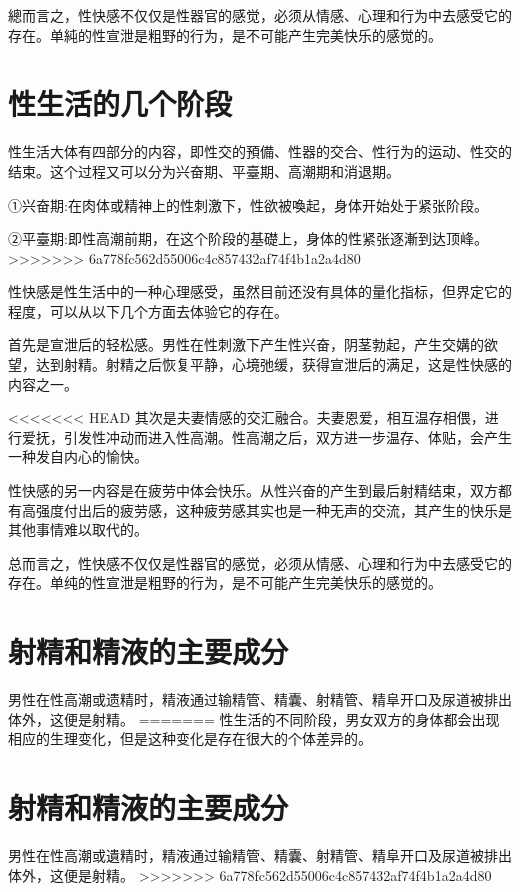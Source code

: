 \documentclass[12pt,UTF8]{ctexbook}
\begin{document}
總而言之，性快感不仅仅是性器官的感觉，必须从情感、心理和行为中去感受它的存在。单純的性宣泄是粗野的行为，是不可能产生完美快乐的感觉的。

\section{性生活的几个阶段}

性生活大体有四部分的内容，即性交的預備、性器的交合、性行为的运动、性交的结束。这个过程又可以分为兴奋期、平臺期、高潮期和消退期。

①兴奋期:在肉体或精神上的性刺激下，性欲被喚起，身体开始处于紧张阶段。

②平臺期:即性高潮前期，在这个阶段的基礎上，身体的性紧张逐漸到达顶峰。
>>>>>>> 6a778fc562d55006c4c857432af74f4b1a2a4d80

性快感是性生活中的一种心理感受，虽然目前还没有具体的量化指标，但界定它的程度，可以从以下几个方面去体验它的存在。

首先是宣泄后的轻松感。男性在性刺激下产生性兴奋，阴茎勃起，产生交媾的欲望，达到射精。射精之后恢复平静，心境弛缓，获得宣泄后的满足，这是性快感的内容之一。

<<<<<<< HEAD
其次是夫妻情感的交汇融合。夫妻恩爱，相互温存相偎，进行爱抚，引发性冲动而进入性高潮。性高潮之后，双方进一步温存、体贴，会产生一种发自内心的愉快。

性快感的另一内容是在疲劳中体会快乐。从性兴奋的产生到最后射精结束，双方都有高强度付出后的疲劳感，这种疲劳感其实也是一种无声的交流，其产生的快乐是其他事情难以取代的。

总而言之，性快感不仅仅是性器官的感觉，必须从情感、心理和行为中去感受它的存在。单纯的性宣泄是粗野的行为，是不可能产生完美快乐的感觉的。

\section{射精和精液的主要成分}

男性在性高潮或遗精时，精液通过输精管、精囊、射精管、精阜开口及尿道被排出体外，这便是射精。
=======
性生活的不同阶段，男女双方的身体都会出现相应的生理变化，但是这种变化是存在很大的个体差异的。

\section{射精和精液的主要成分}

男性在性高潮或遺精时，精液通过输精管、精囊、射精管、精阜开口及尿道被排出体外，这便是射精。
>>>>>>> 6a778fc562d55006c4c857432af74f4b1a2a4d80
\end{document}

